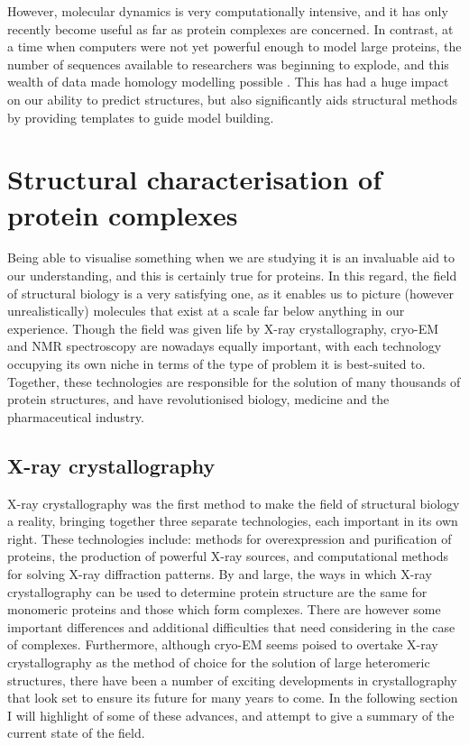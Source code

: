 \documentclass[a4paper,11pt,twoside,openright]{scrbook}
\begin{document}
However, molecular dynamics is very computationally intensive, and it has only recently become useful as far as protein complexes are concerned. In contrast, at a time when computers were not yet powerful enough to model large proteins, the number of sequences available to researchers was beginning to explode, and this wealth of data made homology modelling possible \cite{Rost1996,Xu1998}. This has had a huge impact on our ability to predict structures, but also significantly aids structural methods by providing templates to guide model building.
%

\section{Structural characterisation of protein complexes}
Being able to visualise something when we are studying it is an invaluable aid to our understanding, and this is certainly true for proteins. In this regard, the field of structural biology is a very satisfying one, as it enables us to picture (however unrealistically) molecules that exist at a scale far below anything in our experience. Though the field was given life by X-ray crystallography, cryo-EM and NMR spectroscopy are nowadays equally important, with each technology occupying its own niche in terms of the type of problem it is best-suited to. Together, these technologies are responsible for the solution of many thousands of protein structures, and have revolutionised biology, medicine and the pharmaceutical industry.

\subsection{X-ray crystallography}
X-ray crystallography was the first method to make the field of structural biology a reality, bringing together three separate technologies, each important in its own right. These technologies include: methods for overexpression and purification of proteins, the production of powerful X-ray sources, and computational methods for solving X-ray diffraction patterns. By and large, the ways in which X-ray crystallography can be used to determine protein structure are the same for monomeric proteins and those which form complexes. There are however some important differences and additional difficulties that need considering in the case of complexes. Furthermore, although cryo-EM seems poised to overtake X-ray crystallography as the method of choice for the solution of large heteromeric structures, there have been a number of exciting developments in crystallography that look set to ensure its future for many years to come. In the following section I will highlight of some of these advances, and attempt to give a summary of the current state of the field.
\end{document}
